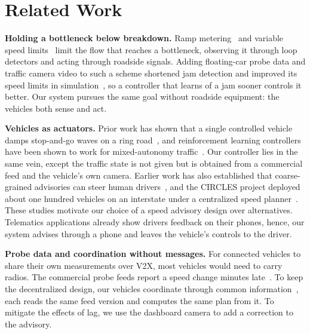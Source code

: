 \section{Related Work}
\label{sec:related}

\noindent\textbf{Holding a bottleneck below breakdown.} Ramp metering~\cite{papageorgiou2002freeway} and variable speed limits~\cite{hegyi2008specialist} limit the flow that reaches a bottleneck, observing it through loop detectors and acting through roadside signals. Adding floating-car probe data and traffic camera video to such a scheme shortened jam detection and improved its speed limits in simulation~\cite{hegyi2013cooperative}, so a controller that learns of a jam sooner controls it better. Our system pursues the same goal without roadside equipment: the vehicles both sense and act.

\noindent\textbf{Vehicles as actuators.} Prior work has shown that a single controlled vehicle damps stop-and-go waves on a ring road~\cite{stern2018dissipation}, and reinforcement learning controllers have been shown to work for mixed-autonomy traffic~\cite{wu2017flow}. Our controller lies in the same vein, except the traffic state is not given but is obtained from a commercial feed and the vehicle's own camera. Earlier work has also established that coarse-grained advisories can steer human drivers~\cite{cho2023temporal}, and the CIRCLES project deployed about one hundred vehicles on an interstate under a centralized speed planner~\cite{lee2024traffic}. These studies motivate our choice of a speed advisory design over alternatives. Telematics applications already show drivers feedback on their phones, hence, our system advises through a phone and leaves the vehicle's controls to the driver.

\noindent\textbf{Probe data and coordination without messages.} For connected vehicles to share their own measurements over V2X, most vehicles would need to carry radios. The commercial probe feeds report a speed change minutes late~\cite{wang2018latency}. To keep the decentralized design, our vehicles coordinate through common information~\cite{nayyar2013common}, each reads the same feed version and computes the same plan from it. To mitigate the effects of lag, we use the dashboard camera to add a correction to the advisory.
